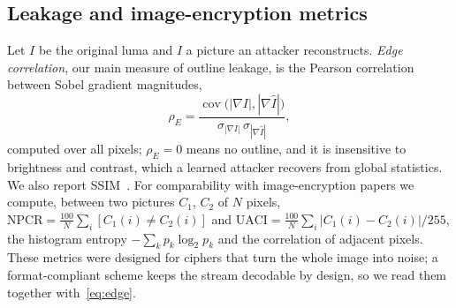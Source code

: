 \subsection{Leakage and image-encryption metrics}\label{sec:metrics}
Let $I$ be the original luma and $\hat I$ a picture an attacker reconstructs. \emph{Edge correlation}, our main measure of outline leakage, is the Pearson correlation between Sobel gradient magnitudes,
\begin{equation}
\rho_E = \frac{\operatorname{cov}\bigl(|\nabla I|, |\nabla \hat I|\bigr)}{\sigma_{|\nabla I|}\,\sigma_{|\nabla \hat I|}},
\label{eq:edge}
\end{equation}
computed over all pixels; $\rho_E = 0$ means no outline, and it is insensitive to brightness and contrast, which a learned attacker recovers from global statistics. We also report SSIM~\cite{ssim}. For comparability with image-encryption papers we compute, between two pictures $C_1$, $C_2$ of $N$ pixels, $\mathrm{NPCR} = \frac{100}{N} \sum_{i} [C_1(i) \ne C_2(i)]$ and $\mathrm{UACI} = \frac{100}{N} \sum_{i} |C_1(i) - C_2(i)| / 255$, the histogram entropy $-\sum_k p_k \log_2 p_k$ and the correlation of adjacent pixels. These metrics were designed for ciphers that turn the whole image into noise; a format-compliant scheme keeps the stream decodable by design, so we read them together with~\eqref{eq:edge}.
